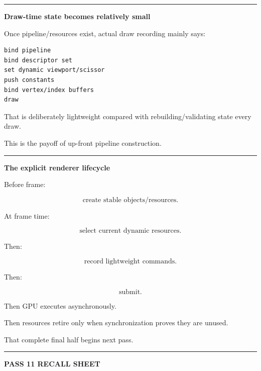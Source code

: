 \begin{center}\rule{0.5\linewidth}{0.5pt}\end{center}

\textbf{Draw-time state becomes relatively small}

Once pipeline/resources exist, actual draw recording mainly says:

\begin{verbatim}
bind pipeline
bind descriptor set
set dynamic viewport/scissor
push constants
bind vertex/index buffers
draw
\end{verbatim}

That is deliberately lightweight compared with rebuilding/validating state every draw.

This is the payoff of up-front pipeline construction.

\begin{center}\rule{0.5\linewidth}{0.5pt}\end{center}

\textbf{The explicit renderer lifecycle}

Before frame:

\[
\text{create stable objects/resources}.
\]

At frame time:

\[
\text{select current dynamic resources}.
\]

Then:

\[
\text{record lightweight commands}.
\]

Then:

\[
\text{submit}.
\]

Then GPU executes asynchronously.

Then resources retire only when synchronization proves they are unused.

That complete final half begins next pass.

\begin{center}\rule{0.5\linewidth}{0.5pt}\end{center}

\textbf{PASS 11 RECALL SHEET}

